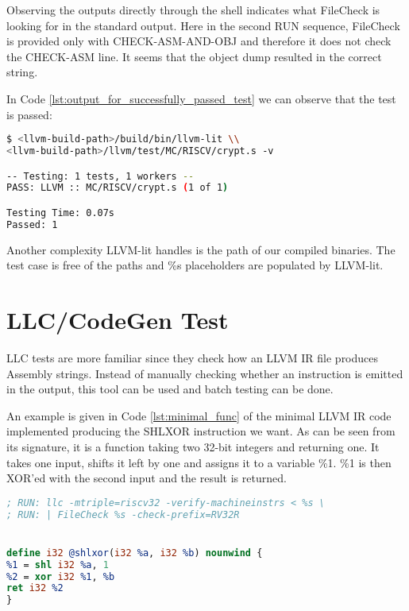 Observing the outputs directly through the shell indicates what FileCheck is looking for in the standard output. Here in the second RUN sequence, FileCheck is provided only with CHECK-ASM-AND-OBJ and therefore it does not check the CHECK-ASM line. It seems that the object dump resulted in the correct string.

In Code \ref{lst:output_for_successfully_passed_test} we can observe that the test is passed:

\begin{minipage}{\linewidth}
\begin{lstlisting}[language=sh, caption={Output for successfully passed test}, label={lst:output_for_successfully_passed_test} ]
$ <llvm-build-path>/build/bin/llvm-lit \\
<llvm-build-path>/llvm/test/MC/RISCV/crypt.s -v

-- Testing: 1 tests, 1 workers --
PASS: LLVM :: MC/RISCV/crypt.s (1 of 1)

Testing Time: 0.07s
Passed: 1
\end{lstlisting}
\end{minipage}

Another complexity LLVM-lit handles is the path of our compiled binaries. The test case is free of the paths and \%s placeholders are populated by LLVM-lit.



\section{LLC/CodeGen Test}\label{sec:llc_test}
LLC tests are more familiar since they check how an LLVM IR file produces Assembly strings. Instead of manually checking whether an instruction is emitted in the output, this tool can be used and batch testing can be done.

An example is given in Code \ref{lst:minimal_func} of the minimal LLVM IR code implemented producing the SHLXOR instruction we want. As can be seen from its signature, it is a function taking two 32-bit integers and returning one. It takes one input, shifts it left by one and assigns it to a variable \%1. \%1 is then XOR’ed with the second input and the result is returned.

\begin{lstlisting}[language=llvm,style=nasm, caption={Minimal shlxor producing LLVM IR}, label={lst:minimal_func} ]
; RUN: llc -mtriple=riscv32 -verify-machineinstrs < %s \ 
; RUN: | FileCheck %s -check-prefix=RV32R 


define i32 @shlxor(i32 %a, i32 %b) nounwind { 
%1 = shl i32 %a, 1 
%2 = xor i32 %1, %b 
ret i32 %2 
} 
\end{lstlisting}




